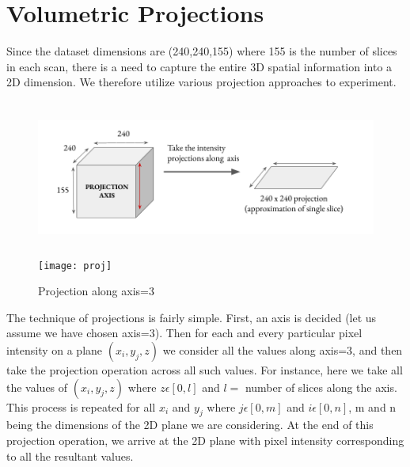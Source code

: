 \section{Volumetric Projections}\label{volumetric}
\vspace*{3mm}

Since the dataset dimensions are (240,240,155) where 155 is the number of slices in each scan, there is a need to capture the entire 3D spatial information into a 2D dimension. We therefore utilize various projection approaches to experiment. 
\begin{figure}[H]
  \begin{center}
    \leavevmode
    \ifpdf
      \includegraphics[height=2in]{Methodology/Chapter3Figs/proj.png}
    \else
      \texttt{[image: proj]}
    \fi
    \caption{Projection along axis=3}
    \label{proj}
  \end{center}
\end{figure}
\vspace*{3mm}

The technique of projections is fairly simple. First, an axis is decided (let us assume we have chosen axis=3). Then for each and every particular pixel intensity on a plane $(x_{i},y_{j},z)$ we consider all the values along axis=3, and then take the projection operation across all such values. For instance, here we take all the values of $(x_{i},y_{j},z)$ where $z\epsilon[0,l]$ and $l=$ number of slices along the axis. This process is repeated for all $x_i$ and $y_j$ where $j\epsilon[0,m]$ and $i\epsilon[0,n]$, m and n being the dimensions of the 2D plane we are considering. At the end of this projection operation, we arrive at the 2D plane with pixel intensity corresponding to all the resultant values. 
\vspace*{3mm}

